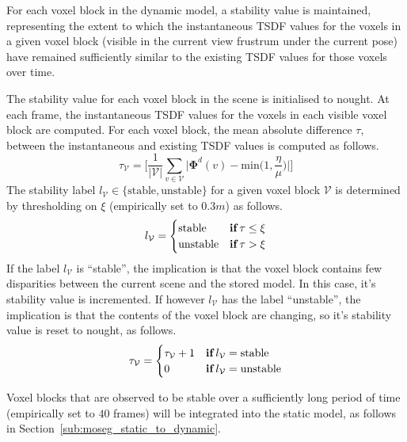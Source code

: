 For each voxel block in the dynamic model, a stability value is maintained, 
representing the extent to which the instantaneous TSDF values for the voxels 
in a given voxel block (visible in the current view frustrum under the current 
pose) have remained sufficiently similar to the existing TSDF values for those voxels
over time.

The stability value for each voxel block in the scene is initialised to nought.
At each frame, the instantaneous TSDF values for the voxels in each visible
voxel block are computed. For each voxel block, the mean absolute difference
\( \tau \), between the instantaneous and existing TSDF values is computed as
follows.
\begin{equation}
  \label{eqn:moseg_stability_value}
  \tau_{\mathcal{V}} = \Bigg[ \frac{1}{|\mathcal{V}|} \sum_{v \in \mathcal{V}}
  \bigg|\bm{\Phi}^{d}(v) - \text{min}\bigg(1, \frac{\eta}{\mu}\bigg)\bigg| \Bigg]
\end{equation}
The stability label \( l_{\mathcal{V}} \in \{\text{stable}, \text{unstable}\} \) for
a given voxel block \(\mathcal{V}\) is determined by thresholding on \( \xi \) 
(empirically set to \(0.3m\)) as follows.
\begin{equation}
  \label{eqn:moseg_stability_labelling}
  l_{\mathcal{V}} =
  \begin{cases}
    \text{stable} & \textbf{if} \mkern4mu \tau \leq \xi \\
    \text{unstable} & \textbf{if} \mkern4mu \tau > \xi
  \end{cases}
\end{equation}
If the label \(l_{\mathcal{V}}\) is ``stable'', the implication is that the voxel
block contains few disparities between the current scene and the stored model.
In this case, it's stability value is incremented. If however
\(l_{\mathcal{V}}\) has the label ``unstable'', the implication is that the
contents of the voxel block are changing, so it's stability value is reset to
nought, as follows.
\begin{equation}
  \label{eqn:moseg_stability_update}
  \tau_{\mathcal{V}} =
  \begin{cases}
    \tau_{\mathcal{V}} + 1 & \textbf{if} \mkern4mu l_{\mathcal{V}} =
    \text{stable}\\
    0 & \textbf{if} \mkern4mu l_{\mathcal{V}} = \text{unstable}
  \end{cases}
\end{equation}

Voxel blocks that are observed to be stable over a sufficiently long period of
time (empirically set to \(40\) frames) will be integrated into the static model,
as follows in Section~\ref{sub:moseg_static_to_dynamic}.

